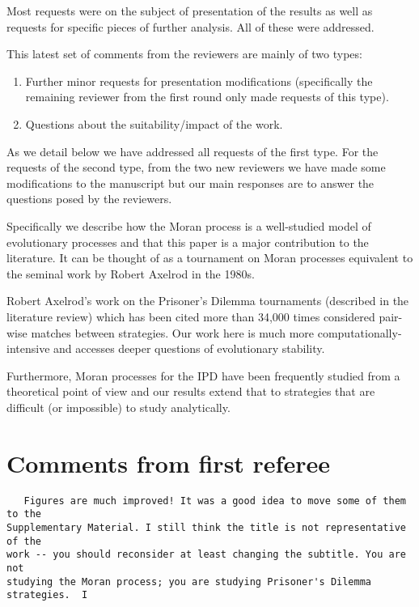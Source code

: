 \documentclass[a4]{article}
\begin{document}
Most requests were on the subject of
presentation of the results as well as requests for specific pieces of further
analysis. All of these were addressed.

This latest set of comments from the reviewers are mainly of two types:

\begin{enumerate}
    \item Further minor requests for presentation modifications (specifically
        the remaining reviewer from the first round only made requests of this
        type).
    \item Questions about the suitability/impact of the work.
\end{enumerate}

As we detail below we have addressed all requests of the first type. For the
requests of the second type, from the two new reviewers we have made some modifications to the manuscript but our
main responses are to answer the questions posed by the reviewers.

Specifically we describe how the Moran process is a well-studied model of
evolutionary processes and that this paper is a major contribution to the
literature. It can be thought of as a tournament on Moran processes equivalent
to the seminal work by Robert Axelrod in the 1980s.

Robert Axelrod's work on the Prisoner's Dilemma tournaments (described in the
literature review) which has been cited more than 34,000 times considered
pair-wise matches between strategies. Our work here is much more
computationally-intensive and accesses deeper questions of evolutionary
stability.

Furthermore, Moran processes for the IPD have been frequently studied from a
theoretical point of view and our results extend that to strategies that are
difficult (or impossible) to study analytically.

\section{Comments from first referee}

\begin{verbatim}
   Figures are much improved! It was a good idea to move some of them to the
Supplementary Material. I still think the title is not representative of the
work -- you should reconsider at least changing the subtitle. You are not
studying the Moran process; you are studying Prisoner's Dilemma strategies.  I
\end{verbatim}
\end{document}
